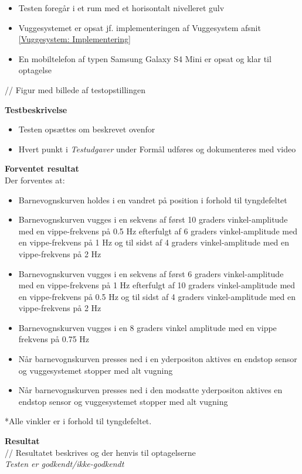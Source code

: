 \begin{itemize}
	\item Testen foregår i et rum med et horisontalt nivelleret gulv
	\item Vuggesystemet er opsat jf. implementeringen af Vuggesystem afsnit \vref{Vuggesystem: Implementering}
	\item En mobiltelefon af typen Samsung Galaxy S4 Mini \citep{website:Samsung} er opsat og klar til optagelse
\end{itemize}
// Figur med billede af testopstillingen

\textbf{Testbeskrivelse}
\begin{itemize}
	\item Testen opsættes om beskrevet ovenfor
	\item Hvert punkt i \textit{Testudgaver} under Formål udføres og dokumenteres med video
\end{itemize}

\textbf{Forventet resultat} \\
Der forventes at:
\begin{itemize}
	\item Barnevognskurven holdes i en vandret på position i forhold til tyngdefeltet
	\item Barnevognskurven vugges i en sekvens af først 10 graders vinkel-amplitude med en vippe-frekvens på 0.5 Hz efterfulgt af 6 graders vinkel-amplitude med en vippe-frekvens på 1 Hz og til sidst af 4 graders vinkel-amplitude med en vippe-frekvens på 2 Hz
	\item Barnevognskurven vugges i en sekvens af først 6 graders vinkel-amplitude med en vippe-frekvens på 1 Hz efterfulgt af 10 graders vinkel-amplitude med en vippe-frekvens på 0.5 Hz og til sidst af 4 graders vinkel-amplitude med en vippe-frekvens på 2 Hz
	\item Barnevognskurven vugges i en 8 graders vinkel amplitude med en vippe frekvens på 0.75 Hz
	\item Når barnevognskurven presses ned i en yderpositon aktives en endstop sensor og vuggesystemet stopper med alt vugning 
	\item Når barnevognskurven presses ned i den modsatte yderpositon aktives en endstop sensor og vuggesystemet stopper med alt vugning 
\end{itemize}
*Alle vinkler er i forhold til tyngdefeltet.

\textbf{Resultat} \\
// Resultatet beskrives og der henvis til optagelserne \\


\textit{Testen er godkendt/ikke-godkendt}
